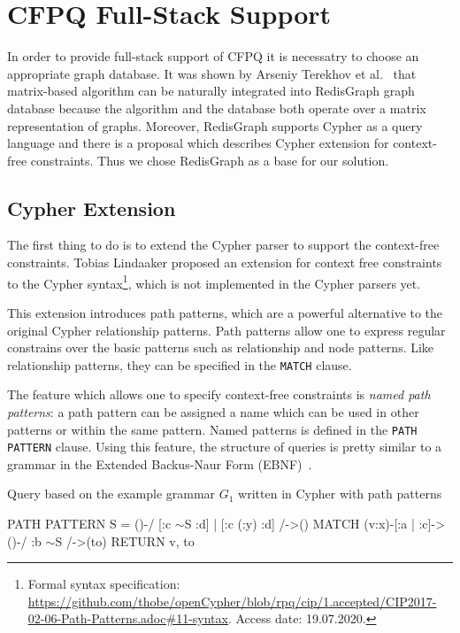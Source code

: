 \section{CFPQ Full-Stack Support}

In order to provide full-stack support of CFPQ it is necessatry to choose an appropriate graph database.
It was shown by Arseniy Terekhov et al.~\cite{10.1145/3398682.3399163} that matrix-based algorithm can be naturally integrated into RedisGraph graph database because the algorithm and the database both operate over a matrix representation of graphs.
Moreover, RedisGraph supports Cypher as a query language and there is a proposal which describes Cypher extension for context-free constraints.
Thus we chose RedisGraph as a base for our solution.


\subsection{Cypher Extension}
\label{subsec:cypher-extension}

The first thing to do is to extend the Cypher parser to support the context-free constraints.
Tobias Lindaaker proposed an extension  for context free constraints to the Cypher syntax\footnote{\label{cypher-proposal}Formal syntax specification: \url{https://github.com/thobe/openCypher/blob/rpq/cip/1.accepted/CIP2017-02-06-Path-Patterns.adoc\#11-syntax}. Access date: 19.07.2020.}, which is not implemented in the Cypher parsers yet.

This extension introduces path patterns, which are a powerful alternative to the original Cypher relationship patterns.
Path patterns allow one to express regular constrains over the basic patterns such as relationship and node patterns.
Like relationship patterns, they can be specified in the \texttt{MATCH} clause.

The feature which allows one to specify context-free constraints is \textit{named path patterns}: a path pattern can be assigned a name which can be used in other patterns or within the same pattern.
Named patterns is defined in the \texttt{PATH PATTERN} clause.
Using this feature, the structure of queries is pretty similar to a grammar in the Extended Backus-Naur Form (EBNF)~\cite{EBNF_ISO}.

\begin{algorithm}
\begin{algorithmic}[1]
\caption{Query based on the example grammar $G_1$ written in Cypher with path patterns}
\label{lst:cypher_example}
\State PATH PATTERN S = ()-/ [:c $\sim$S :d] | [:c (:y) :d] /->()
\State MATCH (v:x)-[:a | :c]->()-/ :b $\sim$S /->(to)
\State RETURN v, to
\end{algorithmic}
\end{algorithm}


